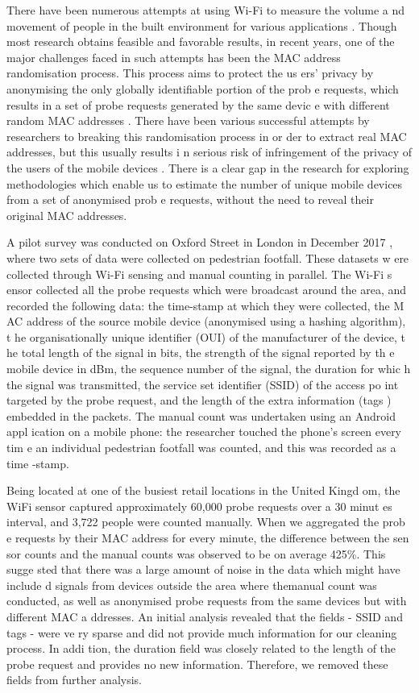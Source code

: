 \documentclass[11t, a4paper, twocolumn]{article}
\begin{document}
	There have been numerous attempts at using Wi-Fi to measure the volume a
nd movement of people in the built environment for various applications \citep{zarim2006,sap2015,reki2007}.
Though most research obtains feasible and favorable 
results, in recent years, one of the major challenges faced in such attempts has
 been the MAC address randomisation process. This process aims to protect the us
ers’ privacy by anonymising the only globally identifiable portion of the prob
e requests, which results in a set of probe requests generated by the same devic
e with different random MAC addresses \citep{green2008}. There have been various
 successful attempts by researchers to breaking this randomisation process in or
der to extract real MAC addresses, \citep{martin2017} but this usually results i
n serious risk of infringement of the privacy of the users of the mobile devices
. There is a clear gap in the research for exploring methodologies which enable 
us to estimate the number of unique mobile devices from a set of anonymised prob
e requests, without the need to reveal their original MAC addresses.

	A pilot survey was conducted on Oxford Street in London in December 2017
, where two sets of data were collected on pedestrian footfall. These datasets w
ere collected through Wi-Fi sensing and manual counting in parallel. The Wi-Fi s
ensor collected all the probe requests which were broadcast around the area, and
 recorded the following data: the time-stamp at which they were collected, the M
AC address of the source mobile device (anonymised using a hashing algorithm), t
he organisationally unique identifier (OUI) of the manufacturer of the device, t
he total length of the signal in bits, the strength of the signal reported by th
e mobile device in dBm, the sequence number of the signal, the duration for whic
h the signal was transmitted, the service set identifier (SSID) of the access po
int targeted by the probe request, and the length of the extra information (tags
) embedded in the packets. The manual count was undertaken using an Android appl
ication on a mobile phone: the researcher touched the phone’s screen every tim
e an individual pedestrian footfall was counted, and this was recorded as a time
-stamp. 

	Being located at one of the busiest retail locations in the United Kingd
om, the WiFi sensor captured approximately 60,000 probe requests over a 30 minut
es interval, and 3,722 people were counted manually. When we aggregated the prob
e requests by their MAC address for every minute, the difference between the sen
sor counts and the manual counts was observed to be on average 425\%. This sugge
sted that there was a large amount of noise in the data which might have include
d signals from devices outside the area where themanual count was conducted, as 
well as anonymised probe requests from the same devices but with different MAC a
ddresses. An initial analysis revealed that the fields - SSID and tags - were ve
ry sparse and did not provide much information for our cleaning process. In addi
tion, the duration field was closely related to the length of the probe request 
and provides no new information. Therefore, we removed these fields from further
 analysis.
\end{document}
